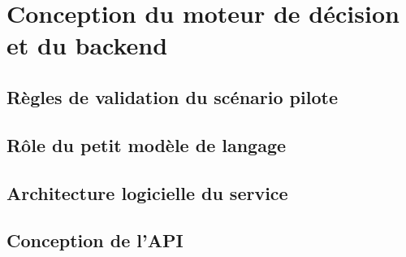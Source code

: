 
\section{Conception du moteur de décision et du backend}


\subsection{Règles de validation du scénario pilote}

\subsection{Rôle du petit modèle de langage}

\subsection{Architecture logicielle du service}

\subsection{Conception de l'API}
